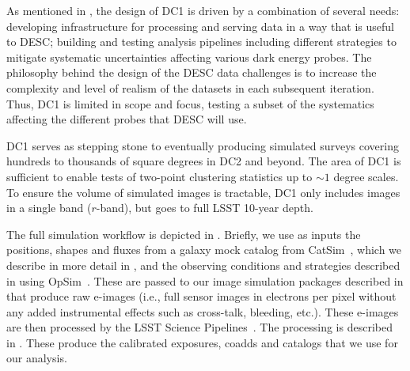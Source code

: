\documentclass[a4paper,fleqn,usenatbib]{mnras}
\begin{document}
As mentioned in , the design of DC1 is driven by a
combination of several needs: developing infrastructure for processing and serving data in a way that is useful to DESC; building and testing analysis pipelines including different strategies to mitigate systematic uncertainties affecting various dark energy probes. The philosophy behind the design of the DESC data challenges is to increase the complexity and level
of realism of the datasets in each subsequent iteration. Thus, DC1 is limited in scope and focus, testing a subset of the systematics affecting the different probes that DESC will use.



DC1 serves as stepping stone to eventually producing simulated surveys covering hundreds to thousands of square degrees in DC2 and beyond.  The area of DC1 is sufficient to enable tests of
two-point clustering statistics up to $\sim 1$ degree scales.  To ensure the volume of simulated images is
tractable, DC1 only includes images in a single band ($r$-band), but goes to full LSST 10-year
depth. 

The full simulation workflow is depicted in . Briefly, we use as inputs the positions, shapes and fluxes from a galaxy mock catalog from CatSim~\citep{2010SPIE.7738E..1OC,2014SPIE.9150E..14C}, which we describe in more detail in , and the observing conditions and strategies described in  using OpSim~\citep{2014SPIE.9150E..15D}. These are passed to our image simulation packages described in  that produce raw e-images (i.e., full sensor images in electrons per pixel without any added instrumental effects such as cross-talk, bleeding, etc.). These e-images are then processed by the LSST Science Pipelines~\citep{2015arXiv151207914J, 2018PASJ...70S...5B}. The processing is described in . These produce the calibrated exposures, coadds and catalogs that we use for our analysis.
\end{document}
